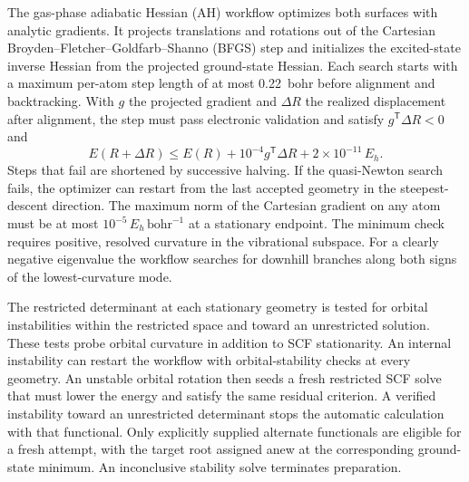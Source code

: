 The gas-phase adiabatic Hessian (AH) workflow optimizes both surfaces
with analytic gradients. It projects translations and rotations out
of the Cartesian Broyden--Fletcher--Goldfarb--Shanno (BFGS) step and
initializes the excited-state inverse Hessian from the projected
ground-state Hessian. Each search starts with a maximum per-atom step
length of at most 0.22~bohr before alignment and backtracking. With $g$
the projected gradient and $\Delta R$ the realized displacement after
alignment, the step must pass electronic validation and satisfy
$g^{\mathsf T}\Delta R<0$ and
\[
 E(R+\Delta R)\le E(R)+10^{-4}g^{\mathsf T}\Delta R+2\times10^{-11}\,E_h .
\]
Steps that fail are shortened by successive halving. If the
quasi-Newton search fails, the optimizer can restart from the last
accepted geometry in the steepest-descent direction. The maximum norm
of the Cartesian gradient on any atom must be at most
$10^{-5}\,E_h\,\mathrm{bohr}^{-1}$ at a stationary endpoint. The
minimum check requires positive, resolved curvature in the vibrational
subspace. For a clearly negative eigenvalue the workflow searches for
downhill branches along both signs of the lowest-curvature mode.

The restricted determinant at each stationary geometry is tested for
orbital instabilities within the restricted space and toward an
unrestricted solution.\cite{stability} These tests probe orbital
curvature in addition to SCF stationarity. An internal instability can
restart the workflow with orbital-stability checks at every geometry.
An unstable orbital rotation then seeds a fresh restricted SCF solve
that must lower the energy and satisfy the same residual criterion.
A verified instability toward an unrestricted determinant stops the
automatic calculation with that functional. Only explicitly supplied
alternate functionals are eligible for a fresh attempt, with the
target root assigned anew at the corresponding ground-state minimum.
An inconclusive stability solve terminates preparation.


